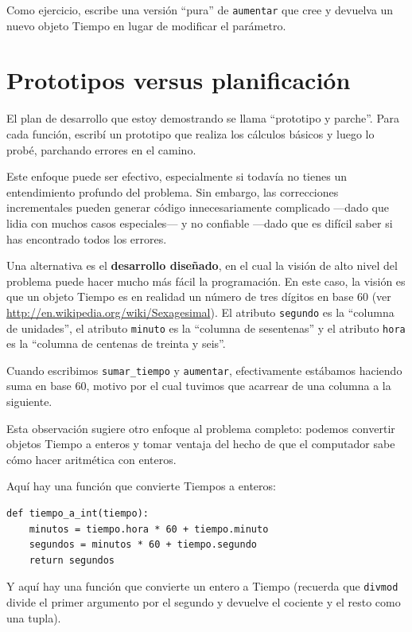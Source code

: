 \documentclass[10pt]{book}
\begin{document}
Como ejercicio, escribe una versión ``pura'' de {\tt aumentar} que
cree y devuelva un nuevo objeto Tiempo en lugar de modificar el
parámetro.


\section{Prototipos versus planificación}
\label{prototype}

El plan de desarrollo que estoy demostrando se llama ``prototipo y
parche''.  Para cada función, escribí un prototipo que realiza los
cálculos básicos y luego lo probé, parchando errores en el
camino.

Este enfoque puede ser efectivo, especialmente si todavía no tienes
un entendimiento profundo del problema.  Sin embargo, las correcciones incrementales pueden
generar código innecesariamente complicado ---dado que lidia con muchos
casos especiales--- y no confiable ---dado que es difícil saber si
has encontrado todos los errores.

Una alternativa es el {\bf desarrollo diseñado}, en el cual la visión
de alto nivel del problema puede hacer mucho más fácil la programación.  En
este caso, la visión es que un objeto Tiempo es en realidad un número
de tres dígitos en base 60 (ver \url{http://en.wikipedia.org/wiki/Sexagesimal}).  El
atributo {\tt segundo} es la ``columna de unidades'', el atributo {\tt minuto}
es la ``columna de sesentenas'' y el atributo {\tt hora} es
la ``columna de centenas de treinta y seis''.

Cuando escribimos \verb"sumar_tiempo" y {\tt aumentar}, efectivamente estábamos
haciendo suma en base 60, motivo por el cual tuvimos que acarrear de una
columna a la siguiente.

Esta observación sugiere otro enfoque al problema completo: podemos
convertir objetos Tiempo a enteros y tomar ventaja del hecho de
que el computador sabe cómo hacer aritmética con enteros.

Aquí hay una función que convierte Tiempos a enteros:

\begin{verbatim}
def tiempo_a_int(tiempo):
    minutos = tiempo.hora * 60 + tiempo.minuto
    segundos = minutos * 60 + tiempo.segundo
    return segundos
\end{verbatim}
%
Y aquí hay una función que convierte un entero a Tiempo
(recuerda que {\tt divmod} divide el primer argumento por el segundo
y devuelve el cociente y el resto como una tupla).
\end{document}
